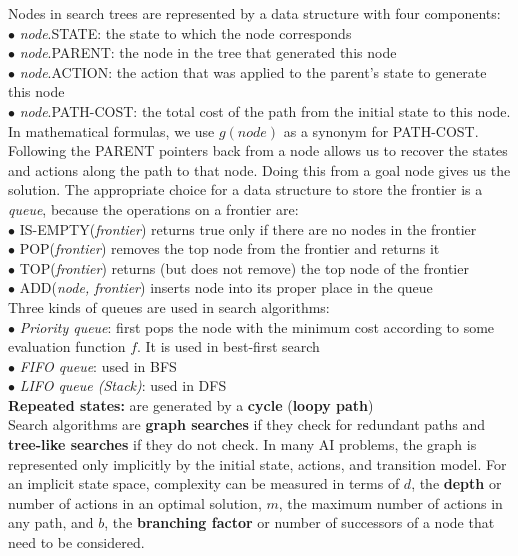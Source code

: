         Nodes in search trees are represented by a data structure with four components: \\
        \indent $\bullet$ \textit{node}.STATE: the state to which the node corresponds \\
        \indent $\bullet$ \textit{node}.PARENT: the node in the tree that generated this node \\
        \indent $\bullet$ \textit{node}.ACTION: the action that was applied to the parent's state to generate this node \\
        \indent $\bullet$ \textit{node}.PATH-COST: the total cost of the path from the initial state to this node. In mathematical formulas, we use $g(node)$ as a synonym for PATH-COST. \\

        Following the PARENT pointers back from a node allows us to recover the states and actions along the path to that node. Doing this from a goal node gives us the solution. The appropriate choice for a data
        structure to store the frontier is a \textit{queue}, because the operations on a frontier are: \\
        \indent $\bullet$ IS-EMPTY(\textit{frontier}) returns true only if there are no nodes in the frontier \\
        \indent $\bullet$ POP(\textit{frontier}) removes the top node from the frontier and returns it \\
        \indent $\bullet$ TOP(\textit{frontier}) returns (but does not remove) the top node of the frontier \\
        \indent $\bullet$ ADD(\textit{node, frontier}) inserts node into its proper place in the queue \\

        Three kinds of queues are used in search algorithms: \\
        \indent $\bullet$ \textit{Priority queue}: first pops the node with the minimum cost according to some evaluation function $f$. It is used in best-first search \\
        \indent $\bullet$ \textit{FIFO queue}: used in BFS \\
        \indent $\bullet$ \textit{LIFO queue (Stack)}: used in DFS \\

        \textbf{Repeated states:} are generated by a \textbf{cycle} (\textbf{loopy path}) \\

        Search algorithms are \textbf{graph searches} if they check for redundant paths and \textbf{tree-like searches} if they do not check. In many AI problems, the graph is represented only implicitly by the
        initial state, actions, and transition model. For an implicit state space, complexity can be measured in terms of $d$, the \textbf{depth} or number of actions in an optimal solution, $m$, the maximum number of
        actions in any path, and $b$, the \textbf{branching factor} or number of successors of a node that need to be considered.

